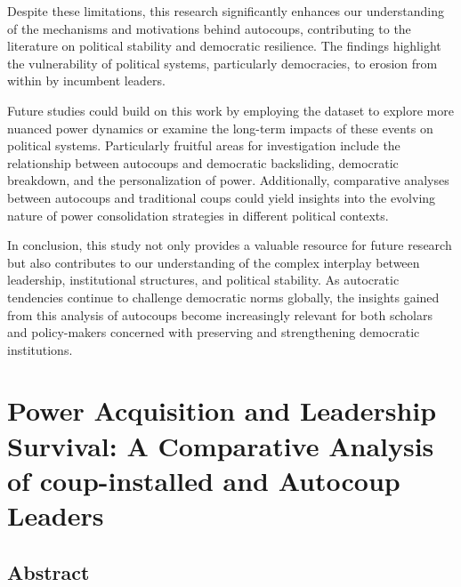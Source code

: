 \documentclass[
  12pt,
]{report}
\begin{document}
Despite these limitations, this research significantly enhances our
understanding of the mechanisms and motivations behind autocoups,
contributing to the literature on political stability and democratic
resilience. The findings highlight the vulnerability of political
systems, particularly democracies, to erosion from within by incumbent
leaders.

Future studies could build on this work by employing the dataset to
explore more nuanced power dynamics or examine the long-term impacts of
these events on political systems. Particularly fruitful areas for
investigation include the relationship between autocoups and democratic
backsliding, democratic breakdown, and the personalization of power.
Additionally, comparative analyses between autocoups and traditional
coups could yield insights into the evolving nature of power
consolidation strategies in different political contexts.

In conclusion, this study not only provides a valuable resource for
future research but also contributes to our understanding of the complex
interplay between leadership, institutional structures, and political
stability. As autocratic tendencies continue to challenge democratic
norms globally, the insights gained from this analysis of autocoups
become increasingly relevant for both scholars and policy-makers
concerned with preserving and strengthening democratic institutions.

\chapter{Power Acquisition and Leadership Survival: A Comparative
Analysis of coup-installed and Autocoup
Leaders}\label{power-acquisition-and-leadership-survival-a-comparative-analysis-of-coup-installed-and-autocoup-leaders}

\section*{Abstract}\label{abstract-3}
\end{document}
